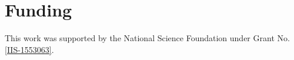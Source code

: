 \documentclass[11pt]{article}
\begin{document}
%









    
\section*{Funding} %
This work was supported by the National Science Foundation under Grant No.\ 
\href{http://nsf.gov/awardsearch/showAward?AWD_ID=1553063}{ [IIS-1553063]}.





   
%
   
%


\end{document}
